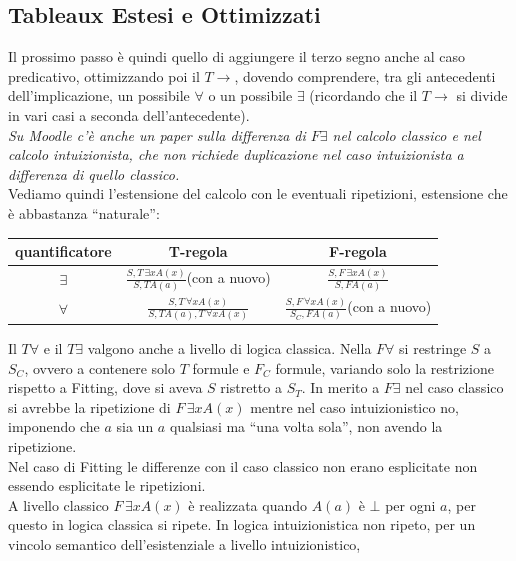 \documentclass[a4paper,12pt, oneside]{book}
\begin{document}
\subsection{Tableaux Estesi e Ottimizzati}
Il prossimo passo è quindi quello di aggiungere il terzo segno anche al caso
predicativo, ottimizzando poi il $T\to$, dovendo comprendere, tra gli
antecedenti dell'implicazione, un possibile $\forall$ o un possibile $\exists$
(ricordando che il $T\to$ si divide in vari casi a seconda dell'antecedente).\\
\textit{Su Moodle c'è anche un paper sulla differenza di $F\exists$ nel calcolo
  classico e nel calcolo intuizionista, che non richiede duplicazione nel caso
  intuizionista a differenza di quello classico.}\\
Vediamo quindi l'estensione del calcolo con le eventuali ripetizioni, estensione
che è abbastanza ``naturale'': 
\begin{table}[H]
  \centering
  \Large
  \begin{tabular}{c||c|c}
    quantificatore & T-regola & F-regola\\
    \hline
    $\exists$ & $\frac{S,T\,\exists x A(x)}{S,TA(a)}${\small{(con a nuovo)}}
                              & $\frac{S,F\,\exists x A(x)}{S,FA(a)}$\\
    \hline
    $\forall$ & $\frac{S,T\,\forall x A(x)}{S,TA(a),T\,\forall x A(x)}$
                              & $\frac{S,F\,\forall x A(x)}{S_C,
                                FA(a)}${\small{(con a nuovo)}}\\
    \hline
  \end{tabular}
\end{table}
Il $T\forall$ e il $T\exists$ valgono anche a livello di logica classica. Nella
$F\forall$ si restringe $S$ a $S_C$, ovvero a contenere solo $T$ formule e $F_C$
formule, variando solo la restrizione rispetto a Fitting, dove si aveva $S$
ristretto a $S_T$. In merito a $F\exists$ nel caso classico si avrebbe la
ripetizione di $F\,\exists x A(x)$ mentre nel caso intuizionistico no, imponendo
che $a$ sia un $a$ qualsiasi ma ``una volta sola'', non avendo la ripetizione.\\
Nel caso di Fitting le differenze con il caso classico non erano esplicitate non
essendo esplicitate le ripetizioni.\\
A livello classico $F\,\exists x A(x)$ è realizzata quando $A(a)$ è $\bot$ per
ogni $a$, per questo in logica classica si ripete. In logica intuizionistica non
ripeto, per un vincolo semantico dell'esistenziale a livello intuizionistico,
\end{document}

